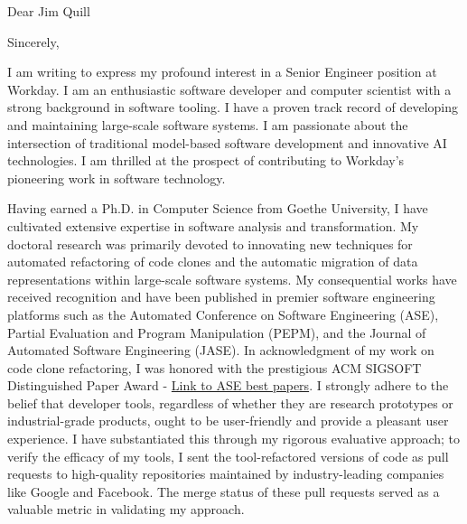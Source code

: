 \documentclass[12pt,a4paper,sans]{moderncv}
\begin{document}
\date{\today}
\opening{Dear Jim Quill}
\closing{Sincerely,}

\makelettertitle

I am writing to express my profound interest in a Senior Engineer position at Workday. I am an enthusiastic software developer and computer scientist with a strong background in software tooling. I have a proven track record of developing and maintaining large-scale software systems. I am passionate about the intersection of traditional model-based software development and innovative AI technologies. I am thrilled at the prospect of contributing to Workday's pioneering work in software technology.

Having earned a Ph.D. in Computer Science from Goethe University, I have cultivated extensive expertise in software analysis and transformation. My doctoral research was primarily devoted to innovating new techniques for automated refactoring of code clones and the automatic migration of data representations within large-scale software systems. My consequential works have received recognition and have been published in premier software engineering platforms such as the Automated Conference on Software Engineering (ASE), Partial Evaluation and Program Manipulation (PEPM), and the Journal of Automated Software Engineering (JASE). In acknowledgment of my work on code clone refactoring, I was honored with the prestigious ACM SIGSOFT Distinguished Paper Award - \href{https://ase-conferences.org/olbib/}{Link to ASE best papers}. I strongly adhere to the belief that developer tools, regardless of whether they are research prototypes or industrial-grade products, ought to be user-friendly and provide a pleasant user experience. I have substantiated this through my rigorous evaluative approach; to verify the efficacy of my tools, I sent the tool-refactored versions of code as pull requests to high-quality repositories maintained by industry-leading companies like Google and Facebook. The merge status of these pull requests served as a valuable metric in validating my approach.
\end{document}
